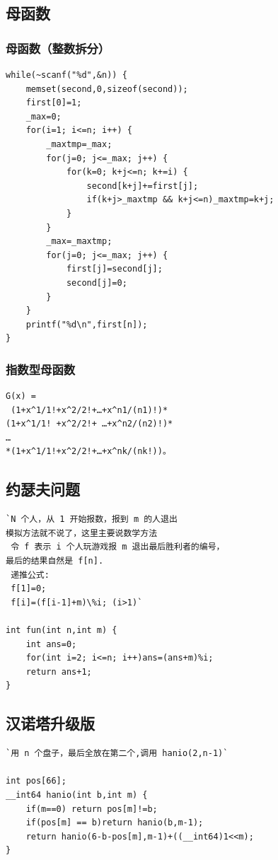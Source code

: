 \documentclass[a4paper]{article}
\begin{document}
\begin{CJK*}{UTF8}{gbsn}
\begin{multicols}{3}
\begin{flushleft}
\subsection{母函数}


\subsubsection{母函数（整数拆分）}
\begin{lstlisting}
while(~scanf("%d",&n)) {
    memset(second,0,sizeof(second));
    first[0]=1;
    _max=0;
    for(i=1; i<=n; i++) {
        _maxtmp=_max;
        for(j=0; j<=_max; j++) {
            for(k=0; k+j<=n; k+=i) {
                second[k+j]+=first[j];
                if(k+j>_maxtmp && k+j<=n)_maxtmp=k+j;
            }
        }
        _max=_maxtmp;
        for(j=0; j<=_max; j++) {
            first[j]=second[j];
            second[j]=0;
        }
    }
    printf("%d\n",first[n]);
}
\end{lstlisting}

\subsubsection{指数型母函数}
\begin{lstlisting}
G(x) =
 (1+x^1/1!+x^2/2!+…+x^n1/(n1)!)* 
(1+x^1/1! +x^2/2!+ …+x^n2/(n2)!)*
…
*(1+x^1/1!+x^2/2!+…+x^nk/(nk!))。 
\end{lstlisting}

\subsection{约瑟夫问题}
\begin{lstlisting}
`N 个人，从 1 开始报数，报到 m 的人退出
模拟方法就不说了，这里主要说数学方法
 令 f 表示 i 个人玩游戏报 m 退出最后胜利者的编号，
最后的结果自然是 f[n].
 递推公式:
 f[1]=0;
 f[i]=(f[i-1]+m)\%i; (i>1)`
 
int fun(int n,int m) {
    int ans=0;
    for(int i=2; i<=n; i++)ans=(ans+m)%i;
    return ans+1;
}
\end{lstlisting}

\subsection{汉诺塔升级版}
\begin{lstlisting}
`用 n 个盘子，最后全放在第二个,调用 hanio(2,n-1)`

int pos[66];
__int64 hanio(int b,int m) {
    if(m==0) return pos[m]!=b;
    if(pos[m] == b)return hanio(b,m-1);
    return hanio(6-b-pos[m],m-1)+((__int64)1<<m);
}
\end{lstlisting}


\end{flushleft}
\end{multicols}
\end{CJK*}
\end{document}
